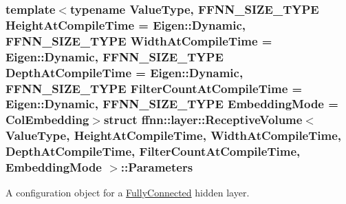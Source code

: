 \subsubsection*{template$<$typename Value\-Type, F\-F\-N\-N\-\_\-\-S\-I\-Z\-E\-\_\-\-T\-Y\-P\-E Height\-At\-Compile\-Time = Eigen\-::\-Dynamic, F\-F\-N\-N\-\_\-\-S\-I\-Z\-E\-\_\-\-T\-Y\-P\-E Width\-At\-Compile\-Time = Eigen\-::\-Dynamic, F\-F\-N\-N\-\_\-\-S\-I\-Z\-E\-\_\-\-T\-Y\-P\-E Depth\-At\-Compile\-Time = Eigen\-::\-Dynamic, F\-F\-N\-N\-\_\-\-S\-I\-Z\-E\-\_\-\-T\-Y\-P\-E Filter\-Count\-At\-Compile\-Time = Eigen\-::\-Dynamic, F\-F\-N\-N\-\_\-\-S\-I\-Z\-E\-\_\-\-T\-Y\-P\-E Embedding\-Mode = Col\-Embedding$>$struct ffnn\-::layer\-::\-Receptive\-Volume$<$ Value\-Type, Height\-At\-Compile\-Time, Width\-At\-Compile\-Time, Depth\-At\-Compile\-Time, Filter\-Count\-At\-Compile\-Time, Embedding\-Mode $>$\-::\-Parameters}

A configuration object for a \hyperlink{classffnn_1_1layer_1_1_fully_connected}{Fully\-Connected} hidden layer. 

